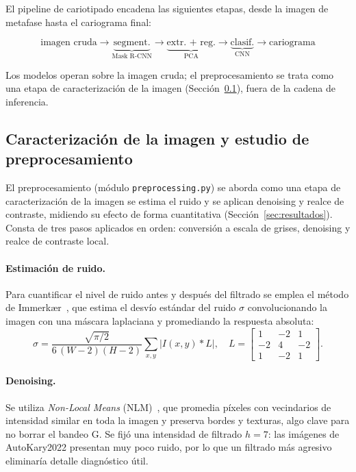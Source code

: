 \documentclass[11pt,a4paper]{article}
\begin{document}
El pipeline de cariotipado encadena las siguientes etapas, desde la imagen de
metafase hasta el cariograma final:

\begin{equation*}
\text{imagen cruda} \rightarrow
\underbrace{\text{segment.}}_{\text{Mask R-CNN}} \rightarrow
\underbrace{\text{extr. + reg.}}_{\text{PCA}} \rightarrow
\underbrace{\text{clasif.}}_{\text{CNN}} \rightarrow
\text{cariograma}
\end{equation*}

Los modelos operan sobre la imagen cruda; el preprocesamiento se trata como una
etapa de caracterización de la imagen (Sección~\ref{sec:preproc}), fuera de la
cadena de inferencia.

\subsection{Caracterización de la imagen y estudio de preprocesamiento}
\label{sec:preproc}

El preprocesamiento (módulo \texttt{preprocessing.py}) se aborda como una etapa de
caracterización de la imagen se estima el ruido y se aplican denoising y
realce de contraste, midiendo su efecto de forma cuantitativa
(Sección~\ref{sec:resultados}). Consta de tres pasos aplicados en orden: conversión
a escala de grises, denoising y realce de contraste local.

\paragraph{Estimación de ruido.} Para cuantificar el nivel de ruido antes y después
del filtrado se emplea el método de Immerkær~\cite{immerkaer1996noise}, que estima
el desvío estándar del ruido \(\sigma\) convolucionando la imagen con una máscara
laplaciana y promediando la respuesta absoluta:
\begin{equation}
\sigma = \frac{\sqrt{\pi/2}}{6\,(W-2)(H-2)} \sum_{x,y} \big| I(x,y) * L \big|,
\quad
L = \begin{bmatrix} 1 & -2 & 1 \\ -2 & 4 & -2 \\ 1 & -2 & 1 \end{bmatrix}.
\end{equation}

\paragraph{Denoising.} Se utiliza \textit{Non-Local Means}
(NLM)~\cite{buades2005nlm}, que promedia píxeles con vecindarios de intensidad
similar en toda la imagen y preserva bordes y texturas, algo clave para no borrar el
bandeo G. Se fijó una intensidad de filtrado \(h=7\): las imágenes de AutoKary2022
presentan muy poco ruido, por lo que un filtrado más agresivo eliminaría detalle
diagnóstico útil.
\end{document}
